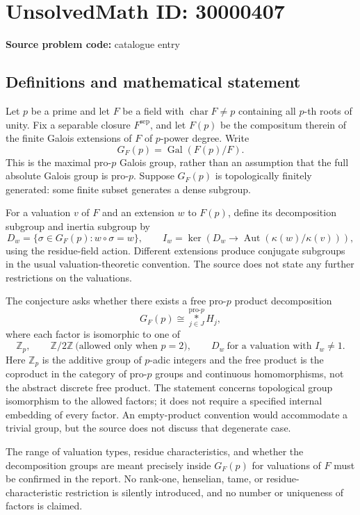 \documentclass[11pt]{article}
\newcommand{\Z}{\mathbb{Z}}
\begin{document}
\section*{UnsolvedMath ID: 30000407}
\textbf{Source problem code:} catalogue entry
\subsection{Definitions and mathematical statement}
Let $p$ be a prime and let $F$ be a field with $\operatorname{char}F\ne p$ containing all $p$-th roots of unity. Fix a separable closure $F^{\mathrm{sep}}$, and let $F(p)$ be the compositum therein of the finite Galois extensions of $F$ of $p$-power degree. Write
\[
 G_F(p)=\operatorname{Gal}(F(p)/F).
\]
This is the maximal pro-$p$ Galois group, rather than an assumption that the full absolute Galois group is pro-$p$. Suppose $G_F(p)$ is topologically finitely generated: some finite subset generates a dense subgroup.

For a valuation $v$ of $F$ and an extension $w$ to $F(p)$, define its decomposition subgroup and inertia subgroup by
\[
 D_w=\{\sigma\in G_F(p):w\circ\sigma=w\},
 \qquad
 I_w=\ker\!\left(D_w\longrightarrow
           \operatorname{Aut}(\kappa(w)/\kappa(v))\right),
\]
using the residue-field action. Different extensions produce conjugate subgroups in the usual valuation-theoretic convention. The source does not state any further restrictions on the valuations.

The conjecture asks whether there exists a free pro-$p$ product decomposition
\[
 G_F(p)\cong\mathop{\ast}\limits_{j\in J}^{\mathrm{pro}\text{-}p}H_j,
\]
where each factor is isomorphic to one of
\[
 \Z_p,\qquad \Z/2\Z\ \text{(allowed only when }p=2\text{)},
 \qquad D_w\ \text{for a valuation with }I_w\ne1.
\]
Here $\Z_p$ is the additive group of $p$-adic integers and the free product is the coproduct in the category of pro-$p$ groups and continuous homomorphisms, not the abstract discrete free product. The statement concerns topological group isomorphism to the allowed factors; it does not require a specified internal embedding of every factor. An empty-product convention would accommodate a trivial group, but the source does not discuss that degenerate case.

The range of valuation types, residue characteristics, and whether the decomposition groups are meant precisely inside $G_F(p)$ for valuations of $F$ must be confirmed in the report. No rank-one, henselian, tame, or residue-characteristic restriction is silently introduced, and no number or uniqueness of factors is claimed.
\end{document}
